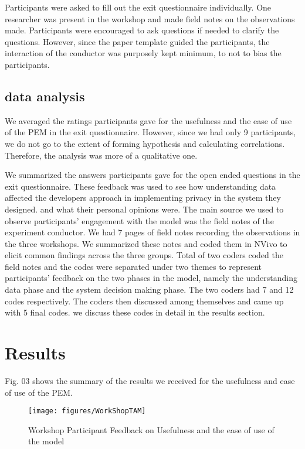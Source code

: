 \documentclass{sigchi}
\begin{document}
Participants were asked to fill out the exit questionnaire individually. One researcher was present in the workshop and made field notes on the observations made. Participants were encouraged to ask questions if needed to clarify the questions. However, since the paper template guided the participants, the interaction of the conductor was purposely kept minimum, to not to bias the participants.

\subsection {data analysis}

We averaged the ratings participants gave for the usefulness and the ease of use of the PEM in the exit questionnaire. However, since we had only 9 participants, we do not go to the extent of forming hypothesis and calculating correlations. Therefore, the analysis was more of a qualitative one. 

We summarized the answers participants gave for the open ended questions in the exit questionnaire. These feedback was used to see how understanding data affected the developers approach in implementing privacy in the system they designed. and what their personal opinions were. The main source we used to observe participants' engagement with the model was the field notes of the experiment conductor. We had 7 pages of field notes recording the observations in the three workshops. We summarized these notes and coded them in NVivo to elicit common findings across the three groups. Total of two coders coded the field notes and the codes were separated under two themes to represent participants' feedback on the two phases in the model, namely the understanding data phase and the system decision making phase. The two coders had 7 and 12 codes respectively. The coders then discussed among themselves and came up with 5 final codes. we discuss these codes in detail in the results section.

\section {Results}

Fig. 03 shows the summary of the results we received for the usefulness and ease of use of the PEM.

\begin{figure}[h]
\begin{center}
\texttt{[image: figures/WorkShopTAM]}
\caption{Workshop Participant Feedback on Usefulness and the ease of use of the model}
\end{center}
\end{figure}
\end{document}
